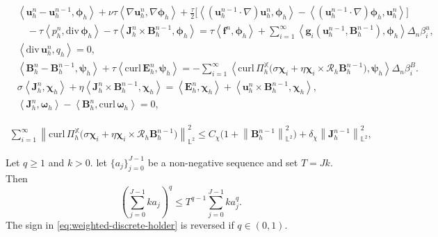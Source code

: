 \documentclass[10pt,a4paper]{amsart}
\newcommand{\bb}{\mathbb}
\newcommand{\bff}{\boldsymbol}
\newcommand{\curl}{\mathrm{curl}\,}
\newcommand{\divg}{\mathrm{div}\,}
\newcommand{\inpro}[2]{\left\langle#1,#2\right\rangle}
\newcommand{\norm}[2]{\left\|{#1}\right\|_{#2}}
\begin{document}
\begin{subequations}\label{equ:stoch fem}
	\begin{align}
		&\inpro{\bff{u}_h^n-\bff{u}_h^{n-1}}{\bff{\phi}_h}
		+\nu\tau\inpro{\nabla\bff{u}_h^n}{\nabla\bff{\phi}_h}
		+\frac{\tau}{2}\Big[\inpro{(\bff{u}_h^{n-1}\cdot\nabla)\bff{u}_h^n}{\bff{\phi}_h}-\inpro{(\bff{u}_h^{n-1}\cdot\nabla)\bff{\phi}_h}{\bff{u}_h^n}\Big]
		\nonumber\\
		&\quad
		-\tau\inpro{p_h^n}{\divg\bff{\phi}_h}
		-\tau\inpro{\bff{J}_h^n\times\bff{B}_h^{n-1}}{\bff{\phi}_h}
		=
		\tau\inpro{\bff{f}^n}{\bff{\phi}_h}
		+\sum_{i=1}^\infty\inpro{\bff{g}_i(\bff{u}_h^{n-1},\bff{B}_h^{n-1})}{\bff{\phi}_h}\Delta_n\beta_i^u,
		\label{equ:stoch fem u}
		\\[1ex]
		&\inpro{\divg\bff{u}_h^n}{q_h}=0,
		\label{equ:stoch fem div u}
		\\[1ex]
		&\inpro{\bff{B}_h^n-\bff{B}_h^{n-1}}{\bff{\psi}_h}
		+\tau\inpro{\curl\bff{E}_h^n}{\bff{\psi}_h}
		=
		-\sum_{i=1}^{\infty}
		\inpro{\curl \Pi_h^{\bb{X}}\bigl(\sigma\bff{\chi}_i+\eta\bff{\chi}_i\times\mathcal{R}_h\bff{B}_h^{n-1}\bigr)}{\bff{\psi}_h}\Delta_n\beta_i^B.
		\label{equ:stoch fem B}
		\\[1ex]
		&\sigma\inpro{\bff{J}_h^n}{\bff{\chi}_h}
		+\eta\inpro{\bff{J}_h^n\times\bff{B}_h^{n-1}}{\bff{\chi}_h}
		=
		\inpro{\bff{E}_h^n}{\bff{\chi}_h}
		+\inpro{\bff{u}_h^n\times\bff{B}_h^{n-1}}{\bff{\chi}_h},
		\label{equ:stoch fem Ohm}
		\\[1ex]
		&\inpro{\bff{J}_h^n}{\bff{\omega}_h}
		-\inpro{\bff{B}_h^n}{\curl\bff{\omega}_h}=0,
		\label{equ:stoch fem J}
	\end{align}
\end{subequations}

\begin{align}\label{equ:hall current coeff bound final}
	\sum_{i=1}^{\infty}\norm{\curl \Pi_h^{\bb{X}}\bigl(\sigma\bff{\chi}_i+\eta\bff{\chi}_i\times\mathcal{R}_h\bff{B}_h^{n-1}\bigr)}{\bb{L}^2}^2
	\leq
	C_\chi\bigl(1+\norm{\bff{B}_h^{n-1}}{\bb{L}^2}^2\bigr)+\delta_\chi\norm{\bff{J}_h^{n-1}}{\bb{L}^2}^2,
\end{align}

\begin{lemma}\label{lem:weighted-discrete-holder}
	Let \(q\ge1\) and $k>0$. let \(\{a_j\}_{j=0}^{J-1}\) be a non-negative sequence and set $T=Jk$. Then
	\begin{equation}\label{eq:weighted-discrete-holder}
		\left(
		\sum_{j=0}^{J-1} k a_j
		\right)^q
		\le
		T^{q-1}
		\sum_{j=0}^{J-1} k a_j^q.
	\end{equation}
	The sign in \eqref{eq:weighted-discrete-holder} is reversed if $q\in (0,1)$.
\end{lemma}
\end{document}
